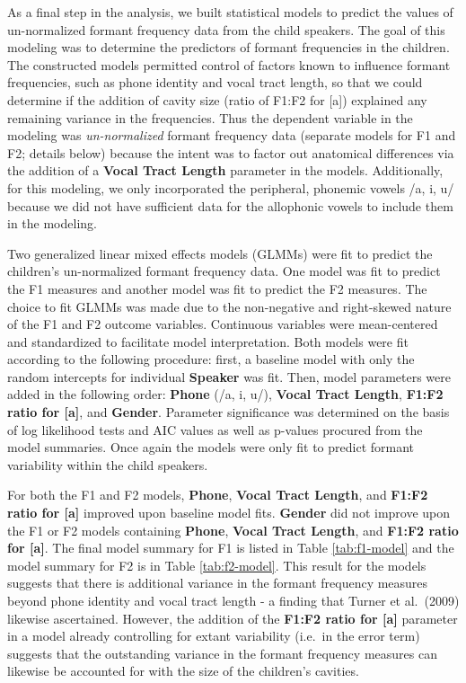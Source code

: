 \documentclass[
]{article}
\begin{document}
As a final step in the analysis, we built statistical models to predict the values of un-normalized formant frequency data from the child speakers. The goal of this modeling was to determine the predictors of formant frequencies in the children. The constructed models permitted control of factors known to influence formant frequencies, such as phone identity and vocal tract length, so that we could determine if the addition of cavity size (ratio of F1:F2 for {[}a{]}) explained any remaining variance in the frequencies. Thus the dependent variable in the modeling was \emph{un-normalized} formant frequency data (separate models for F1 and F2; details below) because the intent was to factor out anatomical differences via the addition of a \textbf{Vocal Tract Length} parameter in the models. Additionally, for this modeling, we only incorporated the peripheral, phonemic vowels /a, i, u/ because we did not have sufficient data for the allophonic vowels to include them in the modeling.

Two generalized linear mixed effects models (GLMMs) were fit to predict the children's un-normalized formant frequency data. One model was fit to predict the F1 measures and another model was fit to predict the F2 measures. The choice to fit GLMMs was made due to the non-negative and right-skewed nature of the F1 and F2 outcome variables. Continuous variables were mean-centered and standardized to facilitate model interpretation. Both models were fit according to the following procedure: first, a baseline model with only the random intercepts for individual \textbf{Speaker} was fit. Then, model parameters were added in the following order: \textbf{Phone} (/a, i, u/), \textbf{Vocal Tract Length}, \textbf{F1:F2 ratio for {[}a{]}}, and \textbf{Gender}. Parameter significance was determined on the basis of log likelihood tests and AIC values as well as p-values procured from the model summaries. Once again the models were only fit to predict formant variability within the child speakers.

For both the F1 and F2 models, \textbf{Phone}, \textbf{Vocal Tract Length}, and \textbf{F1:F2 ratio for {[}a{]}} improved upon baseline model fits. \textbf{Gender} did not improve upon the F1 or F2 models containing \textbf{Phone}, \textbf{Vocal Tract Length}, and \textbf{F1:F2 ratio for {[}a{]}}. The final model summary for F1 is listed in Table \ref{tab:f1-model} and the model summary for F2 is in Table \ref{tab:f2-model}. This result for the models suggests that there is additional variance in the formant frequency measures beyond phone identity and vocal tract length - a finding that Turner et al.~(2009) likewise ascertained. However, the addition of the \textbf{F1:F2 ratio for {[}a{]}} parameter in a model already controlling for extant variability (i.e.~in the error term) suggests that the outstanding variance in the formant frequency measures can likewise be accounted for with the size of the children's cavities.
\end{document}
